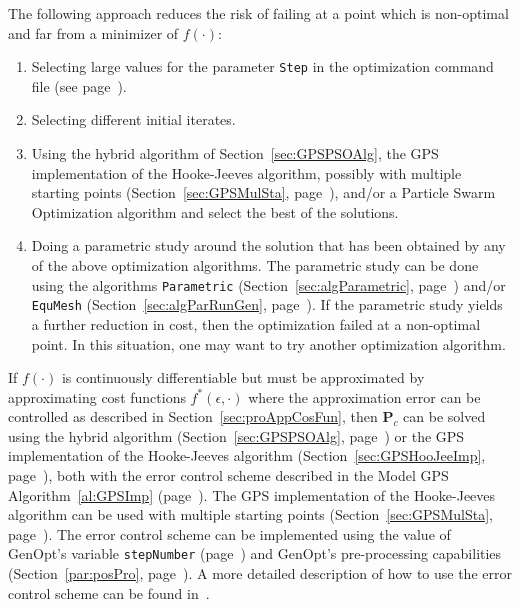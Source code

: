 The following approach reduces the risk of failing at a point which is 
non-optimal and far from a minimizer of $f(\cdot)$:
\begin{enumerate}
\item 
Selecting large values for the parameter \texttt{Step} in 
the optimization command file (see page~\pageref{ite:parStep}).
\item
Selecting different initial iterates.
\item
Using the hybrid algorithm of Section~\ref{sec:GPSPSOAlg},
the GPS implementation of the Hooke-Jeeves algorithm, 
possibly with multiple starting points (Section~\ref{sec:GPSMulSta}, page~\pageref{sec:GPSMulSta}),
and/or
a Particle Swarm Optimization algorithm
and select the best of the solutions.
\item
Doing a parametric study around the solution that has been obtained by
any of the above optimization algorithms.
The parametric study can be done using the algorithms \texttt{Parametric} 
(Section~\ref{sec:algParametric}, page~\pageref{sec:algParametric})
and/or
\texttt{EquMesh} 
(Section~\ref{sec:algParRunGen}, page~\pageref{sec:algParRunGen}).
If the parametric study yields a further reduction in cost,
then the optimization failed at a non-optimal point.
In this situation, one may want to try another optimization algorithm.
\end{enumerate}


If $f(\cdot)$ is continuously differentiable but 
must be approximated by approximating cost functions $f^*(\epsilon,\cdot)$
where the approximation error can be controlled
as described in Section~\ref{sec:proAppCosFun}, 
then $\mathbf P_c$ can be solved using 
the hybrid algorithm (Section~\ref{sec:GPSPSOAlg}, page~\pageref{sec:GPSPSOAlg}) or
the GPS implementation of the Hooke-Jeeves algorithm 
(Section~\ref{sec:GPSHooJeeImp}, page~\pageref{sec:GPSHooJeeImp}), 
both with the error control scheme described in 
the Model GPS Algorithm~\ref{al:GPSImp}
(page~\pageref{al:GPSImp}).
The GPS implementation of the Hooke-Jeeves algorithm can be used
with multiple starting points (Section~\ref{sec:GPSMulSta}, page~\pageref{sec:GPSMulSta}).
The error control scheme can be implemented using the value of GenOpt's variable
\texttt{stepNumber} (page~\pageref{sec:ImpWeiFac})
and GenOpt's pre-processing capabilities
(Section~\ref{par:posPro}, page~\pageref{par:posPro}).
A more detailed description of how to use the error control scheme can
be found in~\cite{PolakWetter2003:1,WetterPolak2003:1}.


